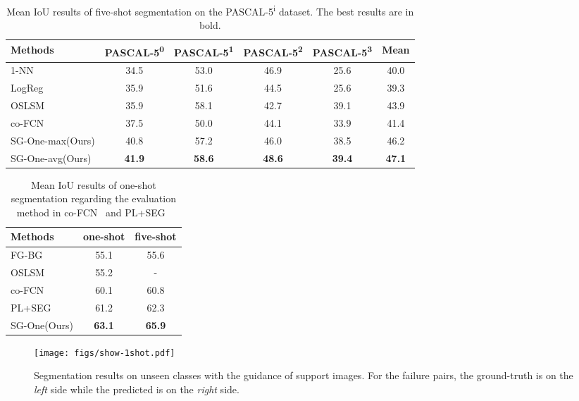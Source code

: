 \documentclass[journal]{IEEEtran}
\begin{document}
\begin{table*}[ht]\setlength{\tabcolsep}{17pt}
  \centering
  \caption{Mean IoU results of five-shot segmentation on the PASCAL-5\textsuperscript{i} dataset. The best results are in bold.}\label{comp_five}
  \begin{tabular}{l|cccc|c}
    \hline
    \hline
    \textbf{Methods} & \textbf{PASCAL-5\textsuperscript{0}} & \textbf{PASCAL-5\textsuperscript{1}} & \textbf{PASCAL-5\textsuperscript{2}} & \textbf{PASCAL-5\textsuperscript{3}} & \textbf{Mean} \\
    \hline
    1-NN & 34.5 & 53.0 & 46.9 & 25.6 & 40.0 \\
LogReg & 35.9 & 51.6 & 44.5 & 25.6 & 39.3\\
OSLSM~\cite{shaban2017one} &  35.9 & 58.1 & 42.7 & 39.1 & 43.9\\
co-FCN~\cite{rakelly2018conditional} &  37.5 & 	50.0 & 44.1 & 33.9 & 41.4\\
SG-One-max(Ours) & 40.8  & 57.2 & 46.0 & 38.5  & 46.2\\
SG-One-avg(Ours) & \textbf{41.9}  & \textbf{58.6} &  \textbf{48.6} & \textbf{39.4} & \textbf{47.1} \\
    \hline
    \hline
  \end{tabular}
  \vspace{-10pt}
\end{table*}

\begin{table}[ht]\setlength{\tabcolsep}{22pt}
  \centering
  \caption{Mean IoU results of one-shot segmentation regarding the evaluation method in co-FCN~\cite{rakelly2018conditional} and PL+SEG~\cite{dong2018few}}\label{metric2-tab}
  \begin{tabular}{l|cc}
    \hline
    \hline
    \textbf{Methods} & \textbf{one-shot} & \textbf{five-shot} \\
    \hline
    FG-BG~\cite{rakelly2018conditional} &  55.1 & 55.6 \\
OSLSM~\cite{shaban2017one} &  55.2 & - \\
co-FCN~\cite{rakelly2018conditional} &  60.1 & 	60.8 \\
PL+SEG~\cite{dong2018few} &  61.2  & 62.3 \\
SG-One(Ours) & \textbf{63.1}  & \textbf{65.9}\\
    \hline
    \hline
  \end{tabular}
  \vspace{-10pt}
\end{table}

\begin{figure*}
  \centering
  \texttt{[image: figs/show-1shot.pdf]}
  \caption{Segmentation results on unseen classes with the guidance of support images. For the failure pairs, the ground-truth is on the \textit{left} side while the predicted is on the \textit{right} side.}\label{show-one}
  \vspace{-12pt}
\end{figure*}
\end{document}
